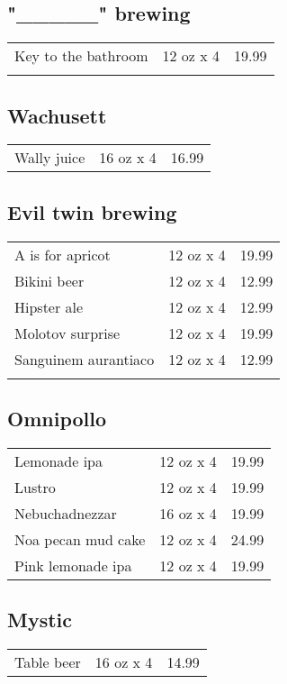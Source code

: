 \documentclass{article}%
\begin{document}
\begin{multicols}{3}
%
\subsection*{"\_\_\_\_\_" brewing}%
\begin{tabular}{l c r}%
\multirow{1}{15ex}{Key to the bathroom}&12 oz x 4&19.99\\%
&&\\%
\end{tabular}

%
\subsection*{Wachusett}%
\begin{tabular}{l c r}%
Wally juice&16 oz x 4&16.99\\%
\end{tabular}

%
\subsection*{Evil twin brewing}%
\begin{tabular}{l c r}%
A is for apricot&12 oz x 4&19.99\\%
Bikini beer&12 oz x 4&12.99\\%
Hipster ale&12 oz x 4&12.99\\%
Molotov surprise&12 oz x 4&19.99\\%
\multirow{1}{15ex}{Sanguinem aurantiaco}&12 oz x 4&12.99\\%
&&\\%
\end{tabular}

%
\subsection*{Omnipollo}%
\begin{tabular}{l c r}%
Lemonade ipa&12 oz x 4&19.99\\%
Lustro&12 oz x 4&19.99\\%
Nebuchadnezzar&16 oz x 4&19.99\\%
Noa pecan mud cake&12 oz x 4&24.99\\%
Pink lemonade ipa&12 oz x 4&19.99\\%
\end{tabular}

%
\subsection*{Mystic}%
\begin{tabular}{l c r}%
Table beer&16 oz x 4&14.99\\%
\end{tabular}


\end{multicols}
\end{document}
